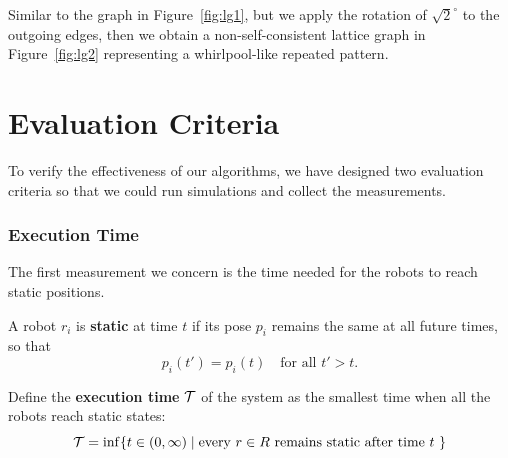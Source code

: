Similar to the graph in Figure~\ref{fig:lg1}, but we apply the rotation of $\sqrt{2}^{\circ}$ to the outgoing edges, 
then we obtain a non-self-consistent lattice graph in Figure~\ref{fig:lg2} representing a whirlpool-like repeated pattern.


\section{Evaluation Criteria}
\label{sec:mrf-eval}

To verify the effectiveness of our algorithms, we have designed two evaluation criteria so that we could run simulations and collect the measurements.

\subsubsection{Execution Time}
The first measurement we concern is the time needed for the robots to reach static positions.

\begin{defn}
A robot $r_i$ is \textbf{static} at time $t$ if its pose $p_i$
remains the same at all future times, so that 
  \begin{equation}
    p_i(t') = p_i(t) \quad \mbox {for all } t' > t.
  \end{equation}
\end{defn}

Define the \textbf{execution time} $\mathcal{T}$ of the system as the smallest time when all the robots reach static states:
\begin{equation}
  \mathcal{T} = \inf \{t \in (0, \infty) \mid \mbox{every $r \in R$ remains static
    after time $t$ } \}
\end{equation}

